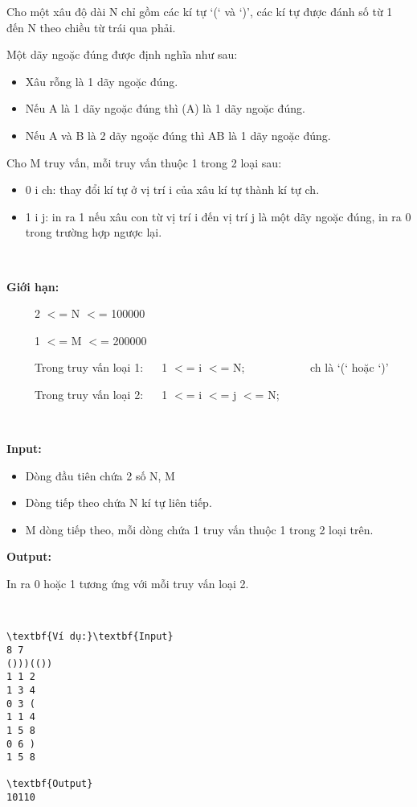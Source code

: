 

Cho một xâu độ dài N chỉ gồm các kí tự ‘(‘ và ‘)’, các kí tự được đánh số từ 1 đến N theo chiều từ trái qua phải.

Một dãy ngoặc đúng được định nghĩa như sau:
\begin{itemize}
	\item Xâu rỗng là 1 dãy ngoặc đúng.
	\item Nếu A là 1 dãy ngoặc đúng thì (A) là 1 dãy ngoặc đúng.
	\item Nếu A và B là 2 dãy ngoặc đúng thì AB là 1 dãy ngoặc đúng.
\end{itemize}

Cho M truy vấn, mỗi truy vấn thuộc 1 trong 2 loại sau:
\begin{itemize}
	\item 0 i ch: thay đổi kí tự ở vị trí i của xâu kí tự thành kí tự ch.
	\item 1 i j: in ra 1 nếu xâu con từ vị trí i đến vị trí j là một dãy ngoặc đúng, in ra 0 trong trường hợp ngược lại.
\end{itemize}

 

\textbf{Giới hạn:}

      2 $<$= N $<$= 100000

      1 $<$= M $<$= 200000

      Trong truy vấn loại 1:    1 $<$= i $<$= N;              ch là ‘(‘ hoặc ‘)’

      Trong truy vấn loại 2:    1 $<$= i $<$= j $<$= N;

 

\textbf{Input:}
\begin{itemize}
	\item Dòng đầu tiên chứa 2 số N, M
	\item Dòng tiếp theo chứa N kí tự liên tiếp.
	\item M dòng tiếp theo, mỗi dòng chứa 1 truy vấn thuộc 1 trong 2 loại trên.
\end{itemize}

\textbf{Output:}

In ra 0 hoặc 1 tương ứng với mỗi truy vấn loại 2.

 
\begin{verbatim}
\textbf{Ví dụ:}\textbf{Input}
8 7
()))(())
1 1 2
1 3 4
0 3 (
1 1 4
1 5 8
0 6 )
1 5 8

\textbf{Output}
10110\end{verbatim}